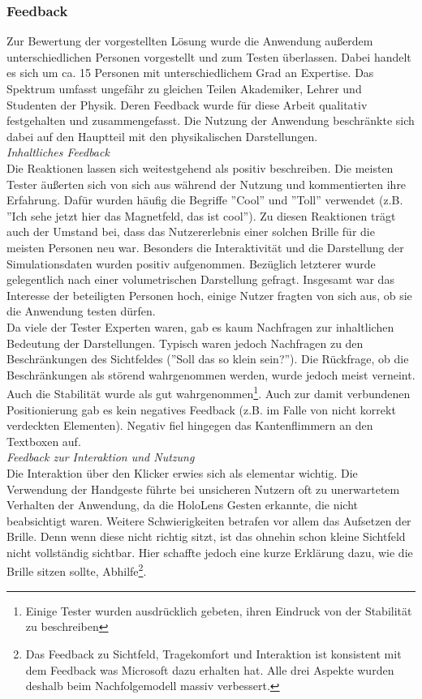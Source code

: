 \subsubsection{Feedback}
Zur Bewertung der vorgestellten Lösung wurde die Anwendung außerdem unterschiedlichen Personen vorgestellt und zum Testen überlassen. Dabei handelt es sich um ca. 15 Personen mit unterschiedlichem Grad an Expertise. Das Spektrum umfasst ungefähr zu gleichen Teilen Akademiker, Lehrer und Studenten der Physik. Deren Feedback wurde für diese Arbeit qualitativ festgehalten und zusammengefasst. Die Nutzung der Anwendung beschränkte sich dabei auf den Hauptteil mit den physikalischen Darstellungen.\\

\textit{Inhaltliches Feedback}\\
Die Reaktionen lassen sich weitestgehend als positiv beschreiben. Die meisten Tester äußerten sich von sich aus während der Nutzung und kommentierten ihre Erfahrung. Dafür wurden häufig die Begriffe ''Cool'' und ''Toll'' verwendet (z.B. ''Ich sehe jetzt hier das Magnetfeld, das ist cool''). Zu diesen Reaktionen trägt auch der Umstand bei, dass das Nutzererlebnis einer solchen Brille für die meisten Personen neu war. Besonders die Interaktivität und die Darstellung der Simulationsdaten wurden positiv aufgenommen. Bezüglich letzterer wurde gelegentlich nach einer volumetrischen Darstellung gefragt. Insgesamt war das Interesse der beteiligten Personen hoch, einige Nutzer fragten von sich aus, ob sie die Anwendung testen dürfen.\\

Da viele der Tester Experten waren, gab es kaum Nachfragen zur inhaltlichen Bedeutung der Darstellungen. Typisch waren jedoch Nachfragen zu den Beschränkungen des Sichtfeldes (''Soll das so klein sein?''). Die Rückfrage, ob die Beschränkungen als störend wahrgenommen werden, wurde jedoch meist verneint. Auch die Stabilität wurde als gut wahrgenommen\footnote{Einige Tester wurden ausdrücklich gebeten, ihren Eindruck von der Stabilität zu beschreiben}. Auch zur damit verbundenen Positionierung gab es kein negatives Feedback (z.B. im Falle von nicht korrekt verdeckten Elementen). Negativ fiel hingegen das Kantenflimmern an den Textboxen auf.\\

\textit{Feedback zur Interaktion und Nutzung}\\
Die Interaktion über den Klicker erwies sich als elementar wichtig. Die Verwendung der Handgeste führte bei unsicheren Nutzern oft zu unerwartetem Verhalten der Anwendung, da die HoloLens Gesten erkannte, die nicht beabsichtigt waren. Weitere Schwierigkeiten betrafen vor allem das Aufsetzen der Brille. Denn wenn diese nicht richtig sitzt, ist das ohnehin schon kleine Sichtfeld nicht vollständig sichtbar. Hier schaffte jedoch eine kurze Erklärung dazu, wie die Brille sitzen sollte, Abhilfe\footnote{Das Feedback zu Sichtfeld, Tragekomfort und Interaktion ist konsistent mit dem Feedback was Microsoft dazu erhalten hat. Alle drei Aspekte wurden deshalb beim Nachfolgemodell massiv verbessert.}.\\

